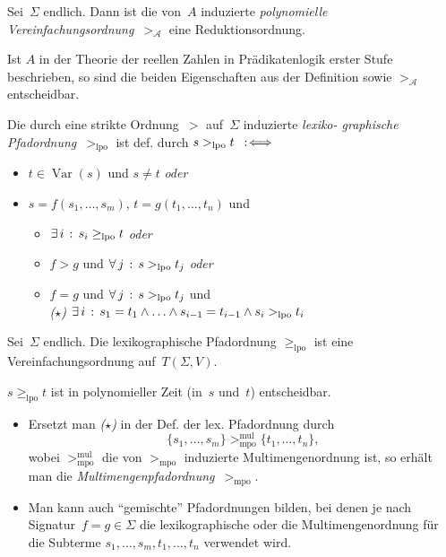 \documentclass{cheat-sheet}
\DeclareMathOperator{\Var}{Var} %
\renewcommand{\Alg}{\mathcal{A}} %
\newcommand{\lpo}{\geq_\text{lpo}} %
\newcommand{\strictLpo}{>_\text{lpo}} %
\newcommand{\strictMpo}{>_\text{mpo}} %
\begin{document}
\begin{beob}
  Sei~$\Sigma$ endlich.
  Dann ist die von~$A$ induzierte \emph{polynomielle Vereinfachungsordnung}~$>_\Alg$ eine Reduktionsordnung.
\end{beob}

\begin{bem}
  Ist $A$ in der Theorie der reellen Zahlen in Prädikatenlogik erster Stufe beschrieben, so sind die beiden Eigenschaften aus der Definition sowie ${>_\Alg}$ entscheidbar.
\end{bem}


\begin{defn}
  Die durch eine strikte Ordnung~${>}$ auf~$\Sigma$ induzierte \emph{lexiko- graphische Pfadordnung}~${\strictLpo}$ ist def. durch $s \strictLpo t \coloniff\,$
  \begin{itemize}
    \item $t \in \Var(s)$ und $s \neq t$ \textit{oder}
    \item $s = f(s_1, \ldots, s_m)$, $t = g(t_1, \ldots, t_n)$ und
    \begin{itemize}
      \item $\ex{i} s_i \lpo t$ \textit{oder}
      \item $f > g$ und $\fa{j} s \strictLpo t_j$ \textit{oder}
      \item $f = g$ und $\fa{j} s \strictLpo t_j$ und \\
      \emph{($\star$)} $\ex{i} s_1 = t_1 \wedge \ldots \wedge s_{i-1} = t_{i-1} \wedge s_i \strictLpo t_i$
    \end{itemize}
  \end{itemize}
\end{defn}

\begin{thm}
  Sei~$\Sigma$ endlich.
  Die lexikographische Pfadordnung ${\lpo}$ ist eine Vereinfachungsordnung auf~$T(\Sigma, V)$.
\end{thm}

\begin{prop}
  $s \lpo t$ ist in polynomieller Zeit (in~$s$ und~$t$) entscheidbar.
\end{prop}

\begin{bemn}
  \begin{itemize}
    \item Ersetzt man \emph{($\star$)} in der Def. der lex. Pfadordnung durch
    \[
      \{ s_1, \ldots, s_m \} \strictMpo^\text{mul} \{ t_1, \ldots, t_n \},
    \]
    wobei ${\strictMpo^\text{mul}}$ die von ${\strictMpo}$ induzierte Multimengenordnung ist, so erhält man die \emph{Multimengenpfadordnung}~${\strictMpo}$.
    \item Man kann auch "`gemischte"' Pfadordnungen bilden, bei denen je nach Signatur~$f = g \in \Sigma$ die lexikographische oder die Multimengenordnung für die Subterme $s_1, \ldots, s_m, t_1, \ldots, t_n$ verwendet wird.
  \end{itemize}
\end{bemn}
\end{document}
